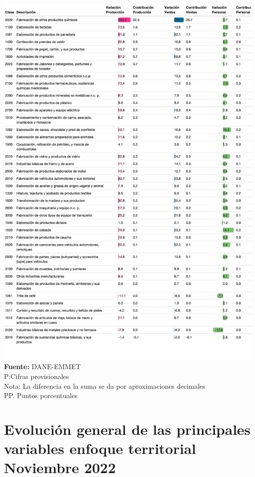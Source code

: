 \documentclass[
]{article}
\begin{document}
\includegraphics{boletin_files/figure-latex/tabla3_view-1.png}
\textbf{Fuente:} DANE-EMMET\\
P:Cifras provisionales\\
Nota: La diferencia en la suma se da por aproximaciones decimales\\
PP. Puntos porcentuales\\

\hypertarget{evoluciuxf3n-general-de-las-principales-variables-enfoque-territorial-noviembre-2022}{%
\section{Evolución general de las principales variables enfoque
territorial Noviembre
2022}\label{evoluciuxf3n-general-de-las-principales-variables-enfoque-territorial-noviembre-2022}}
\end{document}
